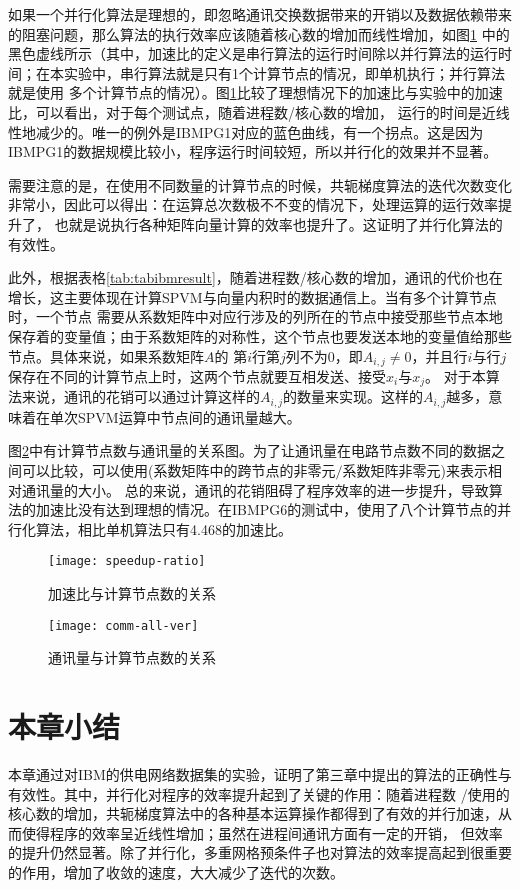 如果一个并行化算法是理想的，即忽略通讯交换数据带来的开销以及数据依赖带来的阻塞问题，那么算法的执行效率应该随着核心数的增加而线性增加，如图\ref{fig:figspeedupratio}
中的黑色虚线所示（其中，加速比的定义是串行算法的运行时间除以并行算法的运行时间；在本实验中，串行算法就是只有1个计算节点的情况，即单机执行；并行算法就是使用
多个计算节点的情况）。图\ref{fig:figspeedupratio}比较了理想情况下的加速比与实验中的加速比，可以看出，对于每个测试点，随着进程数/核心数的增加，
运行的时间是近线性地减少的。唯一的例外是IBMPG1对应的蓝色曲线，有一个拐点。这是因为IBMPG1的数据规模比较小，程序运行时间较短，所以并行化的效果并不显著。

需要注意的是，在使用不同数量的计算节点的时候，共轭梯度算法的迭代次数变化非常小，因此可以得出：在运算总次数极不不变的情况下，处理运算的运行效率提升了，
也就是说执行各种矩阵向量计算的效率也提升了。这证明了并行化算法的有效性。

此外，根据表格\ref{tab:tabibmresult}，随着进程数/核心数的增加，通讯的代价也在增长，这主要体现在计算SPVM与向量内积时的数据通信上。当有多个计算节点时，一个节点
需要从系数矩阵中对应行涉及的列所在的节点中接受那些节点本地保存着的变量值；由于系数矩阵的对称性，这个节点也要发送本地的变量值给那些节点。具体来说，如果系数矩阵$A$的
第$i$行第$j$列不为0，即$A_{i,j}\neq 0$，并且行$i$与行$j$保存在不同的计算节点上时，这两个节点就要互相发送、接受$x_i$与$x_j$。
对于本算法来说，通讯的花销可以通过计算这样的$A_{i,j}$的数量来实现。这样的$A_{i,j}$越多，意味着在单次SPVM运算中节点间的通讯量越大。

图\ref{fig:figcomm}中有计算节点数与通讯量的关系图。为了让通讯量在电路节点数不同的数据之间可以比较，可以使用(系数矩阵中的跨节点的非零元$/$系数矩阵非零元)来表示相对通讯量的大小。
总的来说，通讯的花销阻碍了程序效率的进一步提升，导致算法的加速比没有达到理想的情况。在IBMPG6的测试中，使用了八个计算节点的并行化算法，相比单机算法只有4.468的加速比。

\begin{figure}[H]
  \centering
  \texttt{[image: speedup-ratio]}
  \caption{加速比与计算节点数的关系}
  \label{fig:figspeedupratio}
\end{figure}

\begin{figure}[H]
  \centering
  \texttt{[image: comm-all-ver]}
  \caption{通讯量与计算节点数的关系}
  \label{fig:figcomm}
\end{figure}

\section{本章小结}

本章通过对IBM的供电网络数据集的实验，证明了第三章中提出的算法的正确性与有效性。其中，并行化对程序的效率提升起到了关键的作用：随着进程数
/使用的核心数的增加，共轭梯度算法中的各种基本运算操作都得到了有效的并行加速，从而使得程序的效率呈近线性增加；虽然在进程间通讯方面有一定的开销，
但效率的提升仍然显著。除了并行化，多重网格预条件子也对算法的效率提高起到很重要的作用，增加了收敛的速度，大大减少了迭代的次数。
